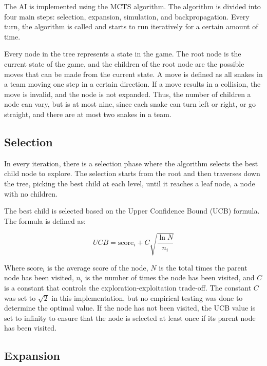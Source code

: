 \documentclass[a4paper,12pt]{article}
\begin{document}
The AI is implemented using the MCTS algorithm. The algorithm is divided into four main steps: selection, expansion, simulation, and backpropagation. Every turn, the algorithm is called and starts to run iteratively for a certain amount of time. 

Every node in the tree represents a state in the game. The root node is the current state of the game, and the children of the root node are the possible moves that can be made from the current state. A move is defined as all snakes in a team moving one step in a certain direction. If a move results in a collision, the move is invalid, and the node is not expanded. Thus, the number of children a node can vary, but is at most nine, since each snake can turn left or right, or go straight, and there are at most two snakes in a team. %


\subsection{Selection}
In every iteration, there is a selection phase where the algorithm selects the best child node to explore. The selection starts from the root and then traverses down the tree, picking the best child at each level, until it reaches a leaf node, a node with no children.


The best child is selected based on the Upper Confidence Bound (UCB) formula. The formula is defined as:

\begin{equation} \label{eq:ucb}
    UCB = \text{score}_i + C \sqrt{\frac{\ln{N}}{n_i}}
\end{equation}

Where $\text{score}_i$ is the average score of the node, $N$ is the total times the parent node has been visited, $n_i$ is the number of times the node has been visited, and $C$ is a constant that controls the exploration-exploitation trade-off. The constant $C$ was set to $\sqrt{2}$ in this implementation, but no empirical testing was done to determine the optimal value. If the node has not been visited, the UCB value is set to infinity to ensure that the node is selected at least once if its parent node has been visited.


\subsection{Expansion}
\end{document}
